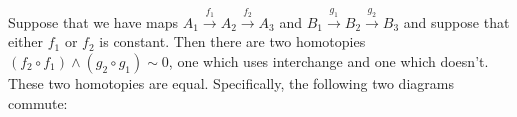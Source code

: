 \documentclass{article}
\newcommand{\lpmap}{\xrightarrow}
\renewcommand{\smash}{\wedge}
\renewcommand{\o}{\ensuremath{\circ}}
\begin{document}
\begin{lem}\label{lem:smash-coh}
  Suppose that we have maps $A_1\lpmap{f_1}A_2\lpmap{f_2}A_3$ and $B_1\lpmap{g_1}B_2\lpmap{g_2}B_3$
  and suppose that either $f_1$ or $f_2$ is constant. Then there are two homotopies
  $(f_2 \o f_1)\smash (g_2 \o g_1)\sim 0$, one which uses interchange and one which doesn't. These two
  homotopies are equal. Specifically, the following two diagrams commute:
\begin{center}
\qquad
{}
\end{center}

\end{lem}
\end{document}
